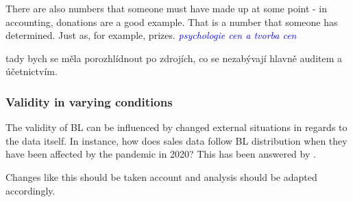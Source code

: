 
There are also numbers that someone must have made up at some point - in accounting, donations are a good example. That is a number that someone has determined. Just as, for example, prizes. \textcolor{blue}{\emph{psychologie cen a tvorba cen}} 

\begin{koment}
    tady bych se měla porozhlídnout po zdrojích, co se nezabývají hlavně auditem a účetnictvím. 
\end{koment}






\subsubsection{Validity in varying conditions} 

The validity of BL can be influenced by changed external situations in regards to the data itself. In instance, how does sales data follow BL distribution when they have been affected by the pandemic in 2020? This has been answered by \citeauthor{Hronova2023}. 


Changes like this should be taken account and analysis should be adapted accordingly. 


